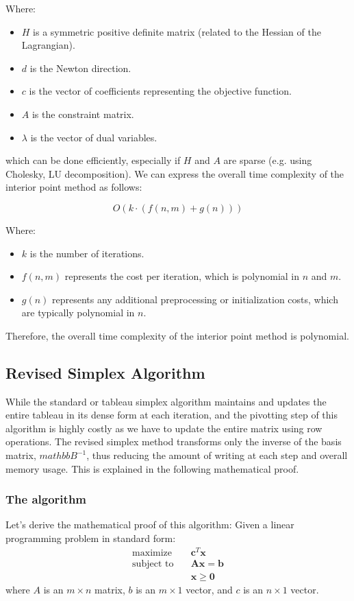 Where:
\begin{itemize}
    \item $H$ is a symmetric positive definite matrix (related to the Hessian of the Lagrangian).
    \item $d$ is the Newton direction.
    \item $c$ is the vector of coefficients representing the objective function.
    \item $A$ is the constraint matrix.
    \item $\lambda$ is the vector of dual variables.
\end{itemize}


which can be done efficiently, especially if $H$ and $A$ are sparse (e.g. using Cholesky, LU decomposition).
We can express the overall time complexity
of the interior point method as follows:

\[
    O(k \cdot (f(n, m) + g(n)))
\]

Where:
\begin{itemize}
    \item $k$ is the number of iterations.
    \item $f(n, m)$ represents the cost per iteration, which is polynomial in $n$ and $m$.
    \item $g(n)$ represents any additional preprocessing or initialization costs, which are typically polynomial in $n$.
\end{itemize}
Therefore, the overall time complexity of the interior point method is polynomial.
\subsection{Revised Simplex Algorithm}
While the standard or tableau simplex algorithm maintains and updates the
entire tableau in its
dense form at each iteration, and the pivotting step of this algorithm is
highly costly as we have to update the entire matrix
using row operations.
The revised simplex
method transforms only the inverse of the basis matrix, $mathbb{B}^{-1}$, thus
reducing the amount of writing at each step and overall memory usage.
This is explained in the following mathematical proof.

\subsubsection{The algorithm}
Let's derive the mathematical proof of this algorithm:
Given a linear programming problem in standard form:
\begin{align*}
    \text{maximize} \quad   & \mathbf{c}^T \mathbf{x}           \\
    \text{subject to} \quad & \mathbf{A}\mathbf{x} = \mathbf{b} \\
                            & \mathbf{x} \geq \mathbf{0}
\end{align*}
where \( A \) is an \( m \times n \) matrix,
\( b \) is an \( m \times 1 \) vector, and
\( c \) is an \( n \times 1 \) vector.


